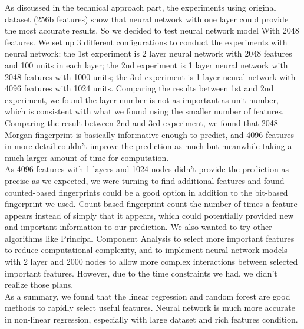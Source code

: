 \documentclass[11pt]{article}
\begin{document}
As discussed in the technical approach part, the experiments using original dataset (256b features) show that neural network with one layer could provide the most accurate results. So we decided to test neural network model With 2048 features. We set up 3 different configurations to conduct the experiments with neural network: the 1st experiment is 2 layer neural network with 2048 features and 100 units in each layer; the 2nd experiment is 1 layer neural network with 2048 features with 1000 units; the 3rd experiment is 1 layer neural network with 4096 features with 1024 units. Comparing the results between 1st and 2nd experiment, we found the layer number is not as important as unit number, which is consistent with what we found using the smaller number of features. Comparing the result between 2nd and 3rd experiment, we found that 2048 Morgan fingerprint is basically informative enough to predict, and 4096 features in more detail couldn't improve the prediction as much but meanwhile taking a much larger amount of time for computation.\\

As 4096 features with 1 layers and 1024 nodes didn't provide the prediction as precise as we expected, we were turning to find additional features and found counted-based fingerprints could be a good option in addition to the bit-based fingerprint we used. Count-based fingerprint count the number of times a feature
appears instead of simply that it appears, which could potentially provided new and important information to our prediction. We also wanted to try other algorithms like Principal Component Analysis to select more important features to reduce computational complexity, and to implement neural network models with 2 layer and 2000 nodes to allow more complex interactions between selected important features. However, due to the time constraints we had, we didn't realize those plans. \\

As a summary, we found that the linear regression and random forest are good methods to rapidly select useful features. Neural network is much more accurate in non-linear regression, especially with large dataset and rich features condition. \\
\end{document}
